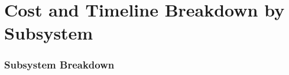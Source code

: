 \documentclass[11pt]{article}
\theoremstyle{definition}
\theoremstyle{remark}
\begin{document}
\part{Cost and Timeline Breakdown by Subsystem}
\label{part:cost}

\section{Subsystem Breakdown}
\label{sec:subsystems}
\end{document}
